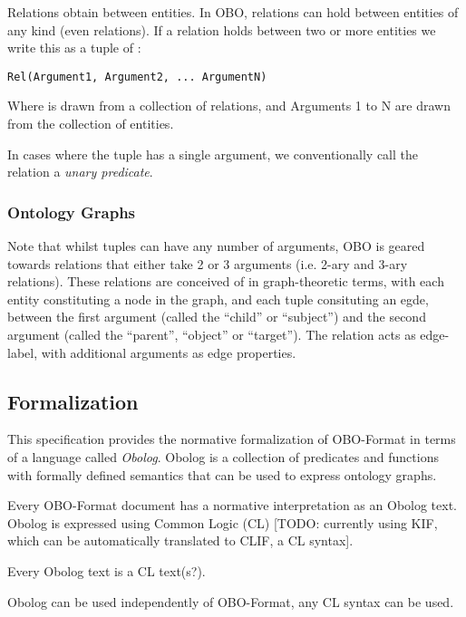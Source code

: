 Relations obtain between entities. In OBO, relations can hold between
entities of any kind (even relations). If a relation  holds
between two or more entities we write this as a tuple of :

\begin{verbatim}
Rel(Argument1, Argument2, ... ArgumentN)
\end{verbatim}

Where  is drawn from a collection of relations, and
Arguments 1 to N are drawn from the collection of entities.

In cases where the tuple has a single argument, we conventionally call
the relation a \emph{unary predicate}.

\subsubsection{Ontology Graphs}

Note that whilst tuples can have any number of arguments, OBO is
geared towards relations that either take 2 or 3 arguments (i.e. 2-ary
and 3-ary relations). These relations are conceived of in
graph-theoretic terms, with each entity constituting a node in the
graph, and each tuple consituting an egde, between the first argument
(called the ``child'' or ``subject'') and the second argument (called
the ``parent'', ``object'' or ``target''). The relation acts as
edge-label, with additional arguments as edge properties.

\subsection{Formalization}

This specification provides the normative formalization of OBO-Format
in terms of a language called \emph{Obolog}. Obolog is a collection of
predicates and functions with formally defined semantics that can be
used to express ontology graphs.

\begin{clist}

\item Every OBO-Format document has a normative interpretation as an Obolog
text. Obolog is expressed using Common Logic (CL) [TODO: currently
using KIF, which can be automatically translated to CLIF, a CL
syntax].

\item Every Obolog text is a CL text(s?).

\item Obolog can be used independently of OBO-Format, any CL syntax can be
used.

\end{clist}

